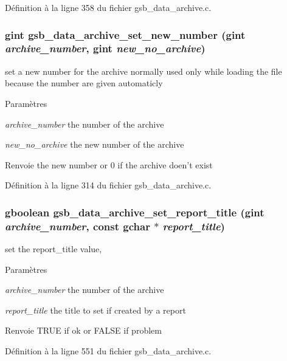 Définition à la ligne 358 du fichier gsb\_\-data\_\-archive.c.

\subsubsection[{gsb\_\-data\_\-archive\_\-set\_\-new\_\-number}]{\setlength{\rightskip}{0pt plus 5cm}gint gsb\_\-data\_\-archive\_\-set\_\-new\_\-number (gint {\em archive\_\-number}, \/  gint {\em new\_\-no\_\-archive})}\label{gsb__data__archive_8c_a85712d057b32e6e854932bc6d9d30b73}
set a new number for the archive normally used only while loading the file because the number are given automaticly


\begin{DoxyParams}{Paramètres}
\item[{\em archive\_\-number}]the number of the archive \item[{\em new\_\-no\_\-archive}]the new number of the archive\end{DoxyParams}
\begin{DoxyReturn}{Renvoie}
the new number or 0 if the archive doen't exist 
\end{DoxyReturn}


Définition à la ligne 314 du fichier gsb\_\-data\_\-archive.c.

\subsubsection[{gsb\_\-data\_\-archive\_\-set\_\-report\_\-title}]{\setlength{\rightskip}{0pt plus 5cm}gboolean gsb\_\-data\_\-archive\_\-set\_\-report\_\-title (gint {\em archive\_\-number}, \/  const gchar $\ast$ {\em report\_\-title})}\label{gsb__data__archive_8c_a29cea4dae2fb32483efd7bc480d07d4d}
set the report\_\-title value,


\begin{DoxyParams}{Paramètres}
\item[{\em archive\_\-number}]the number of the archive \item[{\em report\_\-title}]the title to set if created by a report\end{DoxyParams}
\begin{DoxyReturn}{Renvoie}
TRUE if ok or FALSE if problem 
\end{DoxyReturn}


Définition à la ligne 551 du fichier gsb\_\-data\_\-archive.c.

